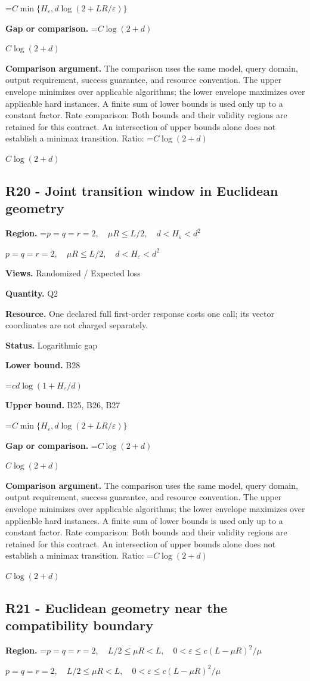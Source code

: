 \documentclass[10pt,a4paper]{article}
\newcommand{\AtlasMath}[1]{\par\begingroup\centering\setbox0=\hbox{$\displaystyle #1$}\ifdim\wd0>1.4\linewidth\typeout{ATLAS WIDE FORMULA: \the\wd0}\fi\ifdim\wd0>\linewidth\resizebox{\linewidth}{!}{\box0}\else\box0\fi\par\endgroup}
\newcommand{\AtlasInlineMath}[1]{\begingroup\setbox0=\hbox{$#1$}\ifdim\wd0>.4\linewidth\endgroup\AtlasMath{#1}\else\endgroup$#1$\fi}
\begin{document}
\AtlasMath{C\min\{H_\varepsilon,d\log(2+LR/\varepsilon)\}}
\textbf{Gap or comparison.} \AtlasInlineMath{C\log(2+d)}

\textbf{Comparison argument.} The comparison uses the same model, query domain, output requirement, success guarantee, and resource convention. The upper envelope minimizes over applicable algorithms; the lower envelope maximizes over applicable hard instances. A finite sum of lower bounds is used only up to a constant factor. Rate comparison: Both bounds and their validity regions are retained for this contract. An intersection of upper bounds alone does not establish a minimax transition. Ratio: \AtlasInlineMath{C\log(2+d)}

\subsection{R20 - Joint transition window in Euclidean geometry}
\textbf{Region.} \AtlasInlineMath{p=q=r=2,\quad\mu R\le L/2,\quad d<H_\varepsilon<d^2}

\textbf{Views.} Randomized / Expected loss

\textbf{Quantity.} Q2

\textbf{Resource.} One declared full first-order response costs one call; its vector coordinates are not charged separately.

\textbf{Status.} Logarithmic gap

\textbf{Lower bound.} B28

\AtlasMath{cd\log(1+H_\varepsilon/d)}
\textbf{Upper bound.} B25, B26, B27

\AtlasMath{C\min\{H_\varepsilon,d\log(2+LR/\varepsilon)\}}
\textbf{Gap or comparison.} \AtlasInlineMath{C\log(2+d)}

\textbf{Comparison argument.} The comparison uses the same model, query domain, output requirement, success guarantee, and resource convention. The upper envelope minimizes over applicable algorithms; the lower envelope maximizes over applicable hard instances. A finite sum of lower bounds is used only up to a constant factor. Rate comparison: Both bounds and their validity regions are retained for this contract. An intersection of upper bounds alone does not establish a minimax transition. Ratio: \AtlasInlineMath{C\log(2+d)}

\subsection{R21 - Euclidean geometry near the compatibility boundary}
\textbf{Region.} \AtlasInlineMath{p=q=r=2,\quad L/2\le\mu R<L,\quad0<\varepsilon\le c(L-\mu R)^2/\mu}
\end{document}
